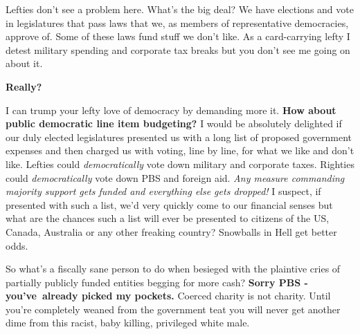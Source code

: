 Lefties don't see a problem here. What's the big deal? We have elections
and vote in legislatures that pass laws that we, as members of
representative democracies, approve of. Some of these laws fund stuff we
don't like. As a card-carrying lefty I detest military spending and
corporate tax breaks but you don't see me going on about it.

\textbf{Really?}

I can trump your lefty love of democracy by demanding more it.
\textbf{How about public democratic line item budgeting?} I would be
absolutely delighted if our duly elected legislatures presented us with
a long list of proposed government expenses and then charged us with
voting, line by line, for what we like and don't like. Lefties could
\emph{democratically} vote down military and corporate taxes. Righties
could \emph{democratically} vote down PBS and foreign aid. \emph{Any
measure commanding majority support gets funded and everything else gets
dropped!} I suspect, if presented with such a list, we'd very quickly
come to our financial senses but what are the chances such a list will
ever be presented to citizens of the US, Canada, Australia or any other
freaking country? Snowballs in Hell get better odds.

So what's a fiscally sane person to do when besieged with the plaintive
cries of partially publicly funded entities begging for more cash?
\textbf{Sorry PBS - you've~already picked my pockets.} Coerced charity
is not charity. Until you're completely weaned from the government teat
you will never get another dime from this racist, baby killing,
privileged white male.




%